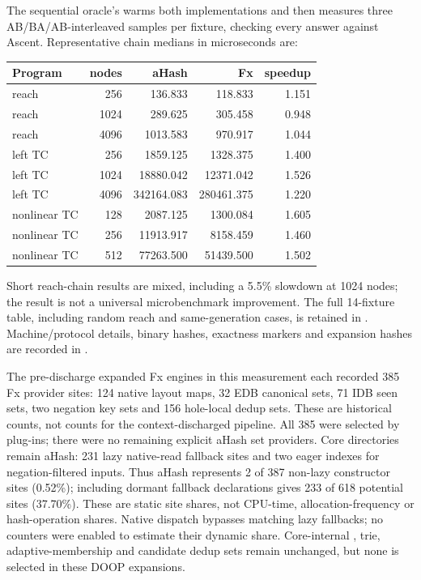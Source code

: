 The sequential oracle's  warms both implementations
and then measures three AB/BA/AB-interleaved samples per fixture, checking
every answer against Ascent. Representative chain medians in microseconds are:
\begin{center}
\begin{tabular}{lrrrr}
\toprule
Program & nodes & aHash & Fx & speedup\\
\midrule
reach & 256 & 136.833 & 118.833 & 1.151\\
reach & 1024 & 289.625 & 305.458 & 0.948\\
reach & 4096 & 1013.583 & 970.917 & 1.044\\
left TC & 256 & 1859.125 & 1328.375 & 1.400\\
left TC & 1024 & 18880.042 & 12371.042 & 1.526\\
left TC & 4096 & 342164.083 & 280461.375 & 1.220\\
nonlinear TC & 128 & 2087.125 & 1300.084 & 1.605\\
nonlinear TC & 256 & 11913.917 & 8158.459 & 1.460\\
nonlinear TC & 512 & 77263.500 & 51439.500 & 1.502\\
\bottomrule
\end{tabular}
\end{center}
Short reach-chain results are mixed, including a 5.5\% slowdown at 1024 nodes;
the result is not a universal microbenchmark improvement. The full 14-fixture
table, including random reach and same-generation cases, is retained in
. Machine/protocol details,
binary hashes, exactness markers and expansion hashes are recorded in
.

The pre-discharge expanded Fx engines in this measurement each recorded 385
Fx provider sites: 124 native layout maps, 32 EDB canonical sets, 71 IDB seen
sets, two negation key sets and 156 hole-local dedup sets. These are historical
counts, not counts for the context-discharged pipeline. All 385 were selected
by plug-ins; there were no
remaining explicit aHash set providers. Core  directories
remain aHash: 231 lazy native-read fallback sites and two eager indexes for
negation-filtered inputs. Thus aHash represents 2 of 387 non-lazy constructor
sites (0.52\%); including dormant fallback declarations gives 233 of 618
potential sites (37.70\%). These are static site shares, not CPU-time,
allocation-frequency or hash-operation shares. Native dispatch bypasses
matching lazy fallbacks; no counters were enabled to estimate their dynamic
share. Core-internal , trie, adaptive-membership and candidate
dedup sets remain unchanged, but none is selected in these DOOP expansions.

